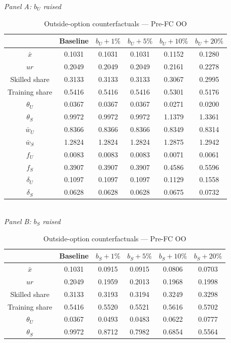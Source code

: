 \begin{table}[htbp]
\centering
\caption{Outside-option counterfactuals — Pre-FC OO}
\label{tab:oo_pre-fc_oo}
\small
\textit{Panel A: \(b_U\) raised}
\\[4pt]
\begin{tabular}{c c c c c c}
\toprule
  & Baseline & $b_U +1\%$ & $b_U +5\%$ & $b_U +10\%$ & $b_U +20\%$ \\
\midrule
\(\bar{x}\) & 0.1031 & 0.1031 & 0.1031 & 0.1152 & 0.1280 \\
\(ur\) & 0.2049 & 0.2049 & 0.2049 & 0.2161 & 0.2278 \\
Skilled share & 0.3133 & 0.3133 & 0.3133 & 0.3067 & 0.2995 \\
Training share & 0.5416 & 0.5416 & 0.5416 & 0.5301 & 0.5176 \\
\(\theta_U\) & 0.0367 & 0.0367 & 0.0367 & 0.0271 & 0.0200 \\
\(\theta_S\) & 0.9972 & 0.9972 & 0.9972 & 1.1379 & 1.3361 \\
\(\bar{w}_U\) & 0.8366 & 0.8366 & 0.8366 & 0.8349 & 0.8314 \\
\(\bar{w}_S\) & 1.2824 & 1.2824 & 1.2824 & 1.2875 & 1.2942 \\
\(f_U\) & 0.0083 & 0.0083 & 0.0083 & 0.0071 & 0.0061 \\
\(f_S\) & 0.3907 & 0.3907 & 0.3907 & 0.4586 & 0.5596 \\
\(\delta_U\) & 0.1097 & 0.1097 & 0.1097 & 0.1129 & 0.1558 \\
\(\delta_S\) & 0.0628 & 0.0628 & 0.0628 & 0.0675 & 0.0732 \\
\bottomrule
\end{tabular}
\\[10pt]
\textit{Panel B: \(b_S\) raised}
\\[4pt]
\begin{tabular}{c c c c c c}
\toprule
  & Baseline & $b_S +1\%$ & $b_S +5\%$ & $b_S +10\%$ & $b_S +20\%$ \\
\midrule
\(\bar{x}\) & 0.1031 & 0.0915 & 0.0915 & 0.0806 & 0.0703 \\
\(ur\) & 0.2049 & 0.1959 & 0.2013 & 0.1968 & 0.1998 \\
Skilled share & 0.3133 & 0.3193 & 0.3194 & 0.3249 & 0.3298 \\
Training share & 0.5416 & 0.5520 & 0.5521 & 0.5616 & 0.5702 \\
\(\theta_U\) & 0.0367 & 0.0493 & 0.0483 & 0.0622 & 0.0777 \\
\(\theta_S\) & 0.9972 & 0.8712 & 0.7982 & 0.6854 & 0.5564 \\

\end{tabular}
\end{table}
